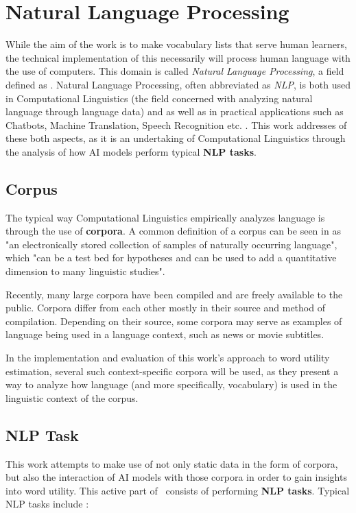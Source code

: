 \section{Natural Language Processing} \label{sec:natural-language-processing}
While the aim of the work is to make vocabulary lists that serve human learners, the technical implementation of this necessarily will process human language with the use of computers.
This domain is called \textit{Natural Language Processing}, a field defined as \toresearch {}.
Natural Language Processing, often abbreviated as \textit{NLP}, is both used in Computational Linguistics (the field concerned with analyzing natural language through language data) and as well as in practical applications such as Chatbots, Machine Translation, Speech Recognition etc. .
This work addresses of these both aspects, as it is an undertaking of Computational Linguistics through the analysis of how AI models perform typical \textbf{NLP tasks}.

\subsection{Corpus}
The typical way Computational Linguistics empirically analyzes language is through the use of \textbf{corpora}.
A common definition of a corpus can be seen in  as "an electronically stored collection of samples of naturally occurring language", which "can be a test bed for hypotheses and can be used to add a quantitative dimension to many linguistic studies".

Recently, many large corpora have been compiled and are freely available to the public.
Corpora differ from each other mostly in their source and method of compilation.
Depending on their source, some corpora may serve as examples of language being used in a language context, such as news or movie subtitles.

In the implementation and evaluation of this work's approach to word utility estimation, several such context-specific corpora will be used, as they present a way to analyze how language (and more specifically, vocabulary) is used in the linguistic context of the corpus.

\subsection{NLP Task}
This work attempts to make use of not only static data in the form of corpora, but also the interaction of AI models with those corpora in order to gain insights into word utility.
This active part of \NLP\ consists of performing \textbf{NLP tasks}.
Typical NLP tasks include :

